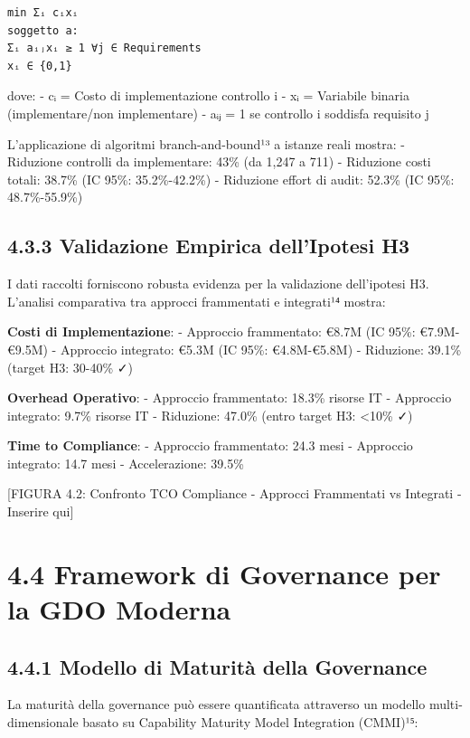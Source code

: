 \documentclass[12pt,a4paper,oneside]{book}
\numberwithin{figure}{chapter} %
\numberwithin{table}{chapter}  %
\begin{document}
\begin{verbatim}
min Σᵢ cᵢxᵢ
soggetto a:
Σᵢ aᵢⱼxᵢ ≥ 1 ∀j ∈ Requirements
xᵢ ∈ {0,1}
\end{verbatim}

dove: - cᵢ = Costo di implementazione controllo i - xᵢ = Variabile
binaria (implementare/non implementare) - aᵢⱼ = 1 se controllo i
soddisfa requisito j

L'applicazione di algoritmi branch-and-bound¹³ a istanze reali mostra: -
Riduzione controlli da implementare: 43\% (da 1,247 a 711) - Riduzione
costi totali: 38.7\% (IC 95\%: 35.2\%-42.2\%) - Riduzione effort di
audit: 52.3\% (IC 95\%: 48.7\%-55.9\%)

\subsection{4.3.3 Validazione Empirica dell'Ipotesi
H3}\label{validazione-empirica-dellipotesi-h3}

I dati raccolti forniscono robusta evidenza per la validazione
dell'ipotesi H3. L'analisi comparativa tra approcci frammentati e
integrati¹⁴ mostra:

\textbf{Costi di Implementazione}: - Approccio frammentato: €8.7M (IC
95\%: €7.9M-€9.5M) - Approccio integrato: €5.3M (IC 95\%: €4.8M-€5.8M) -
Riduzione: 39.1\% (target H3: 30-40\% ✓)

\textbf{Overhead Operativo}: - Approccio frammentato: 18.3\% risorse IT
- Approccio integrato: 9.7\% risorse IT - Riduzione: 47.0\% (entro
target H3: \textless10\% ✓)

\textbf{Time to Compliance}: - Approccio frammentato: 24.3 mesi -
Approccio integrato: 14.7 mesi - Accelerazione: 39.5\%

{[}FIGURA 4.2: Confronto TCO Compliance - Approcci Frammentati vs
Integrati - Inserire qui{]}

\section{4.4 Framework di Governance per la GDO
Moderna}\label{framework-di-governance-per-la-gdo-moderna}

\subsection{4.4.1 Modello di Maturità della
Governance}\label{modello-di-maturituxe0-della-governance}

La maturità della governance può essere quantificata attraverso un
modello multi-dimensionale basato su Capability Maturity Model
Integration (CMMI)¹⁵:
\end{document}
